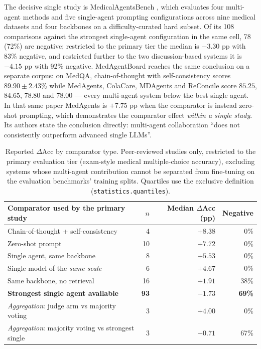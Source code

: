 \documentclass[11pt,a4paper]{article}
\begin{document}
The decisive single study is MedicalAgentsBench \citep{tang2503}, which evaluates four
multi-agent methods and five single-agent prompting configurations across nine medical
datasets and four backbones on a difficulty-curated hard subset. Of its 108 comparisons
against the strongest single-agent configuration in the same cell, 78 (72\%) are negative;
restricted to the primary tier the median is $-3.30$ pp with 83\% negative, and restricted
further to the two discussion-based systems it is $-4.15$ pp with 92\% negative.
MedAgentBoard \citep{zhu2505} reaches the same conclusion on a separate corpus: on MedQA,
chain-of-thought with self-consistency scores $89.90\pm2.43$\% while MedAgents, ColaCare,
MDAgents and ReConcile score $85.25$, $84.65$, $78.80$ and $78.00$ --- every multi-agent
system below the best single agent. In that same paper MedAgents is $+7.75$ pp when the
comparator is instead zero-shot prompting, which demonstrates the comparator effect
\emph{within a single study}. Its authors state the conclusion directly: multi-agent
collaboration ``does not consistently outperform advanced single LLMs''.

\begin{table}[ht]\centering\small
\caption{Reported $\Delta$Acc by comparator type. Peer-reviewed studies only, restricted to
the primary evaluation tier (exam-style medical multiple-choice accuracy), excluding systems
whose multi-agent contribution cannot be separated from fine-tuning on the evaluation
benchmarks' training splits. Quartiles use the exclusive definition
(\texttt{statistics.quantiles}).}
\label{tab:comparator}
\begin{tabular}{lrrr}
\toprule
Comparator used by the primary study & $n$ & Median $\Delta$Acc (pp) & Negative \\
\midrule
Chain-of-thought + self-consistency       & 4   & $+8.38$ & 0\% \\
Zero-shot prompt                          & 10  & $+7.72$ & 0\% \\
Single agent, same backbone               & 8   & $+5.53$ & 0\% \\
Single model of the \emph{same scale}     & 6   & $+4.67$ & 0\% \\
Same backbone, no retrieval               & 16  & $+1.91$ & 38\% \\
\textbf{Strongest single agent available} & \textbf{93} & $\mathbf{-1.73}$ & \textbf{69\%} \\
\midrule
\emph{Aggregation}: judge arm vs majority voting        & 3 & $+4.00$ & 0\% \\
\emph{Aggregation}: majority voting vs strongest single & 3 & $-0.71$ & 67\% \\
\bottomrule
\end{tabular}
\end{table}
\end{document}
